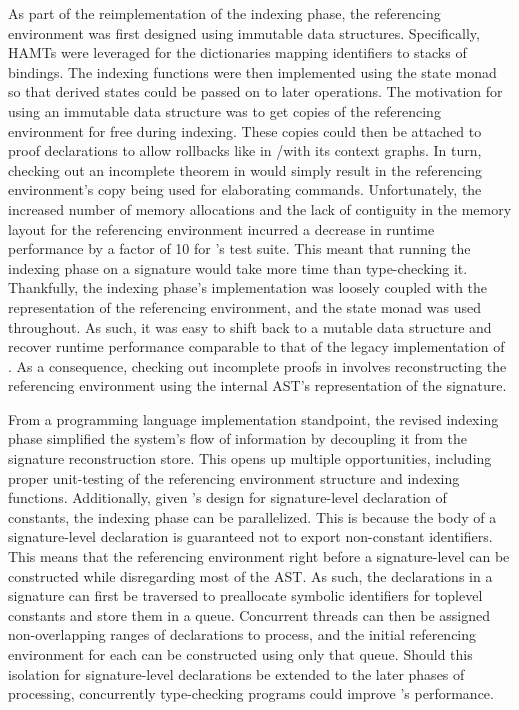 As part of the reimplementation of the indexing phase, the referencing environment was first designed using immutable data structures.
Specifically, \acp{HAMT} were leveraged for the dictionaries mapping identifiers to stacks of bindings.
The indexing functions were then implemented using the state monad so that derived states could be passed on to later operations.
The motivation for using an immutable data structure was to get copies of the referencing environment for free during indexing.
These copies could then be attached to proof declarations to allow rollbacks like in \Isabelle/\Isar with its context graphs.
In turn, checking out an incomplete theorem in \Harpoon would simply result in the referencing environment's copy being used for elaborating commands.
Unfortunately, the increased number of memory allocations and the lack of contiguity in the memory layout for the referencing environment incurred a decrease in runtime performance by a factor of 10 for \Beluga's test suite.
This meant that running the indexing phase on a signature would take more time than type-checking it.
Thankfully, the indexing phase's implementation was loosely coupled with the representation of the referencing environment, and the state monad was used throughout.
As such, it was easy to shift back to a mutable data structure and recover runtime performance comparable to that of the legacy implementation of \Beluga.
As a consequence, checking out incomplete proofs in \Harpoon involves reconstructing the referencing environment using the internal \ac{AST}'s representation of the signature.


From a programming language implementation standpoint, the revised indexing phase simplified the system's flow of information by decoupling it from the signature reconstruction store.
This opens up multiple opportunities, including proper unit-testing of the referencing environment structure and indexing functions.
Additionally, given \Beluga's design for signature-level declaration of constants, the indexing phase can be parallelized.
This is because the body of a signature-level declaration is guaranteed not to export non-constant identifiers.
This means that the referencing environment right before a signature-level can be constructed while disregarding most of the \ac{AST}.
As such, the declarations in a signature can first be traversed to preallocate symbolic identifiers for toplevel constants and store them in a queue.
Concurrent threads can then be assigned non-overlapping ranges of declarations to process, and the initial referencing environment for each can be constructed using only that queue.
Should this isolation for signature-level declarations be extended to the later phases of processing, concurrently type-checking programs could improve \Beluga's performance.

